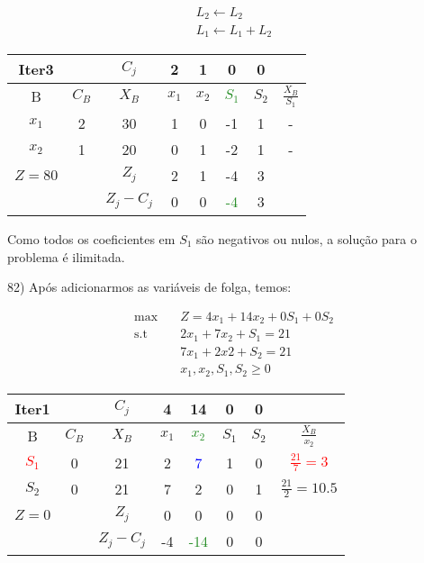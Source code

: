 \documentclass[]{article}
\begin{document}
\begin{align*}
    L_2 \leftarrow L_2 \\
    L_1 \leftarrow L_1 + L_2
\end{align*}

\begin{center}
 \begin{tabular}{| c | c | c | c | c | c | c | c |} 
 \hline
 Iter3 &   & $C_j$ & 2 & 1 & 0 & 0 &  \\ [0.5ex] 
 \hline
 B & $C_B$ & $X_B$ & $x_1$ & $x_2$ & \textcolor{ForestGreen}{$S_1$} & $S_2$ & $\frac{X_B}{S_1}$ \\ 
 \hline
 $x_1$ & 2 & 30 & 1 & 0 & -1 & 1 & -\\
 \hline
 $x_2$ & 1 & 20 & 0 & 1 & -2 & 1 & -\\
 \hline
 $Z=80$ &   & $Z_j$ & 2 & 1 & -4 & 3 &   \\
 \hline
  &   & $Z_j - C_j$ & 0 & 0 & \textcolor{ForestGreen}{-4} & 3 &  \\
 \hline
\end{tabular}
\end{center}

Como todos os coeficientes em $S_1$ são negativos ou nulos, a solução para o problema é ilimitada.

\vspace{0.5cm}

82) Após adicionarmos as variáveis de folga, temos:

\begin{align*}
    \max        &\quad Z = 4x_1 + 14x_2 + 0S_1 + 0S_2 \\
    \text{s.t}  &\quad 2x_1 + 7x_2 + S_1 = 21 \\
                &\quad 7x_1 + 2x2 + S_2 = 21 \\
                &\quad x_1, x_2, S_1, S_2 \geq 0
\end{align*}

\begin{center}
 \begin{tabular}{| c | c | c | c | c | c | c | c |} 
 \hline
 Iter1 &   & $C_j$ & 4 & 14 & 0 & 0 &  \\ [0.5ex] 
 \hline
 B & $C_B$ & $X_B$ & $x_1$ & \textcolor{ForestGreen}{$x_2$} & $S_1$ & $S_2$ & $\frac{X_B}{x_2}$ \\ 
 \hline
 \textcolor{red}{$S_1$} & 0 & 21 & 2 & \textcolor{blue}{7} & 1 & 0 & \textcolor{red}{$\frac{21}{7}=3$} \\
 \hline
 $S_2$ & 0 & 21 & 7 & 2 & 0 & 1 & $\frac{21}{2}=10.5$\\
 \hline
 $Z=0$ &   & $Z_j$ & 0 & 0 & 0 & 0 &   \\
 \hline
  &   & $Z_j - C_j$ & -4 & \textcolor{ForestGreen}{-14} & 0 & 0 &  \\
 \hline
\end{tabular}
\end{center}
\end{document}
